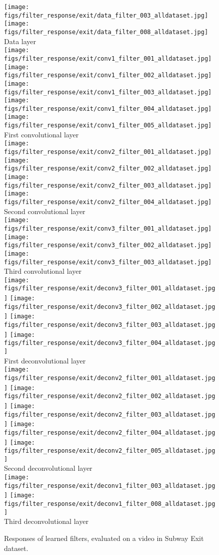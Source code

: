 \documentclass[10pt,twocolumn,letterpaper]{article}
\begin{document}
\begin{figure}[h]
	\centering
	\texttt{[image: figs/filter\_response/exit/data\_filter\_003\_alldataset.jpg]}
	\texttt{[image: figs/filter\_response/exit/data\_filter\_008\_alldataset.jpg]}\\
	{\footnotesize Data layer}\\
	\texttt{[image: figs/filter\_response/exit/conv1\_filter\_001\_alldataset.jpg]}
	\texttt{[image: figs/filter\_response/exit/conv1\_filter\_002\_alldataset.jpg]}
	\texttt{[image: figs/filter\_response/exit/conv1\_filter\_003\_alldataset.jpg]}
	\texttt{[image: figs/filter\_response/exit/conv1\_filter\_004\_alldataset.jpg]}
	\texttt{[image: figs/filter\_response/exit/conv1\_filter\_005\_alldataset.jpg]}\\
	{\footnotesize First convolutional layer}\\
	\texttt{[image: figs/filter\_response/exit/conv2\_filter\_001\_alldataset.jpg]}
	\texttt{[image: figs/filter\_response/exit/conv2\_filter\_002\_alldataset.jpg]}
	\texttt{[image: figs/filter\_response/exit/conv2\_filter\_003\_alldataset.jpg]}
	\texttt{[image: figs/filter\_response/exit/conv2\_filter\_004\_alldataset.jpg]}\\
	{\footnotesize Second convolutional layer}\\
	\texttt{[image: figs/filter\_response/exit/conv3\_filter\_001\_alldataset.jpg]}
	\texttt{[image: figs/filter\_response/exit/conv3\_filter\_002\_alldataset.jpg]}
	\texttt{[image: figs/filter\_response/exit/conv3\_filter\_003\_alldataset.jpg]}\\
	{\footnotesize Third convolutional layer}\\
	\texttt{[image: figs/filter\_response/exit/deconv3\_filter\_001\_alldataset.jpg]}
	\texttt{[image: figs/filter\_response/exit/deconv3\_filter\_002\_alldataset.jpg]}
	\texttt{[image: figs/filter\_response/exit/deconv3\_filter\_003\_alldataset.jpg]}
	\texttt{[image: figs/filter\_response/exit/deconv3\_filter\_004\_alldataset.jpg]}\\
	{\footnotesize First deconvolutional layer}\\
	\texttt{[image: figs/filter\_response/exit/deconv2\_filter\_001\_alldataset.jpg]}
	\texttt{[image: figs/filter\_response/exit/deconv2\_filter\_002\_alldataset.jpg]}
	\texttt{[image: figs/filter\_response/exit/deconv2\_filter\_003\_alldataset.jpg]}
	\texttt{[image: figs/filter\_response/exit/deconv2\_filter\_004\_alldataset.jpg]}
	\texttt{[image: figs/filter\_response/exit/deconv2\_filter\_005\_alldataset.jpg]}\\
	{\footnotesize Second deconvolutional layer}\\
	\texttt{[image: figs/filter\_response/exit/deconv1\_filter\_003\_alldataset.jpg]}
	\texttt{[image: figs/filter\_response/exit/deconv1\_filter\_008\_alldataset.jpg]}\\
	{\footnotesize Third deconvolutional layer}\\
	\caption{Responses of learned filters, evaluated on a video in Subway Exit dataset.}
\end{figure}
\end{document}

